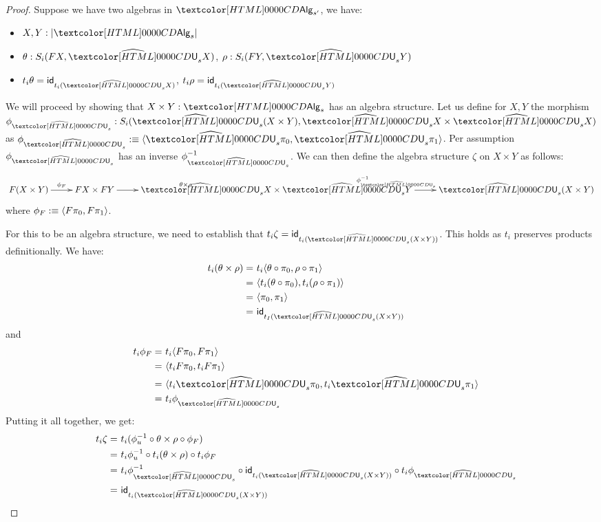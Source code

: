 \begin{proof}
  Suppose we have two algebras in $\Alg_{s'}$, \ie we have:
  \begin{itemize}
  \item $X, Y : | \Alg_s |$
  \item $\theta : S_i(FX,\extendfunc{\Und}_sX)$, $\rho : S_i(FY,\extendfunc{\Und}_sY)$
  \item $t_i \theta = \id_{t_i (\extendfunc{\Und}_s X)}$, $t_i \rho = \id_{t_i (\extendfunc{\Und}_s Y)}$
  \end{itemize}

  We will proceed by showing that $X \times Y : \Alg_s$ has an algebra
  structure. Let us define for $X, Y$ the morphism
  $\phi_{\extendfunc{\Und}_s} : S_i(\extendfunc{\Und}_s(X \times Y), \extendfunc{\Und}_s X \times \extendfunc{\Und}_s X)$ as
  $\phi_{\extendfunc{\Und}_s} \ddefeq \langle \extendfunc{\Und}_s \pi_0 , \extendfunc{\Und}_s \pi_1 \rangle$. Per assumption
  $\phi_{\extendfunc{\Und}_s}$ has an inverse $\phi_{\extendfunc{\Und}_s}^{-1}$. We can then define the
  algebra structure $\zeta$ on $X \times Y$ as follows:
  $$
  \xymatrix{ 
    F(X \times Y) \ar[r]^{\phi_F}
    &FX \times FY \ar[r]^{\theta \times \rho} 
    &\extendfunc{\Und}_sX \times \extendfunc{\Und}_sY \ar[r]^{\phi_{\extendfunc{\Und}_s}^{-1}} 
    &\extendfunc{\Und}_s(X \times Y) 
  }
  $$
  where $\phi_F :\equiv \langle F \pi_0 , F \pi_1 \rangle$.
  
  For this to be an algebra structure, we need to establish that
  $t_i \zeta = \id_{t_i (\extendfunc{\Und}_s (X \times Y))}$. This holds as
  $t_i$ preserves products definitionally. We have:
  \begin{align*}
    &&t_i (\theta \times \rho) =&\ t_i \langle \theta \circ \pi_0 , \rho \circ \pi_1 \rangle \\
    &&=&\ \langle t_i (\theta \circ \pi_0) , t_i (\rho \circ \pi_1) \rangle \\
    &&=&\ \langle \pi_0 , \pi_1 \rangle \\
    &&=&\ \id_{t_I (\extendfunc{\Und}_s (X \times Y))}
  \end{align*}
  and
  \begin{align*}
    &&t_i \phi_F =&\ t_i \langle F \pi_0 , F \pi_1 \rangle \\
    &&=&\ \langle t_i F \pi_0 , t_i F \pi_1 \rangle \\
    &&=&\ \langle t_i \extendfunc{\Und}_s \pi_0 , t_i \extendfunc{\Und}_s \pi_1 \rangle \\
    &&=&\ t_i \phi_{\extendfunc{\Und}_s}
  \end{align*}
  Putting it all together, we get:
  \begin{align*}
    &&t_i \zeta =&\ t_i (\phi_u^{-1} \circ \theta \times \rho \circ \phi_F) \\
    &&=&\ t_i \phi_u^{-1} \circ t_i (\theta \times \rho) \circ t_i \phi_F \\
    &&=&\ t_i \phi_{\extendfunc{\Und}_s}^{-1} \circ \id_{t_i (\extendfunc{\Und}_s (X \times Y))} \circ t_i \phi_{\extendfunc{\Und}_s} \\
    &&=&\ \id_{t_i (\extendfunc{\Und}_s (X \times Y))}
  \end{align*}


\end{proof}
